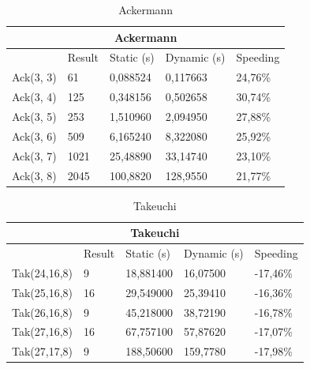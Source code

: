 \documentclass[ack,preface]{dithesis}
\begin{document}
\begin{table}[h!]
\centering
\begin{tabular}{ |p{3cm}||p{2cm}|p{3cm}|p{3cm}||p{2cm}|  }

 \hline
 \multicolumn{5}{|c|}{Ackermann} \\
 \hline
 	& Result &Static (s)&Dynamic (s)&Speeding\\
 \hline
 Ack(3, 3) & 61      &0,088524    &  0,117663    &   24,76\%\\
 Ack(3, 4) & 125    &0,348156    &  0,502658    &  30,74\%\\
 Ack(3, 5) & 253    & 1,510960   &  2,094950    &   27,88\%\\
 Ack(3, 6) & 509    & 6,165240   &  8,322080    &   25,92\%\\
 Ack(3, 7) & 1021  & 25,48890   &  33,14740  &   23,10\%\\
 Ack(3, 8) & 2045  &100,8820    &  128,9550  &  21,77\%\\
 \hline
\end{tabular}
\caption{Ackermann}
\label{table:1}
\end{table}

\begin{table}[h!]
\centering
\begin{tabular}{ |p{3cm}||p{2cm}|p{3cm}|p{3cm}||p{2.5cm}|  }

 \hline
 \multicolumn{5}{|c|}{Takeuchi} \\
 \hline
 	& Result &Static (s)&Dynamic (s)&Speeding\\
 \hline
 Tak(24,16,8) & 9    &  18,881400   &  16,07500     &  -17,46\%\\
 Tak(25,16,8) & 16  &  29,549000   &  25,39410     &  -16,36\%\\
 Tak(26,16,8) & 9    &  45,218000   &  38,72190    &   -16,78\%\\
 Tak(27,16,8) & 16  &  67,757100   &  57,87620    &   -17,07\%\\
 Tak(27,17,8) & 9    &  188,50600  & 159,7780   &  -17,98\%\\
 \hline
\end{tabular}
\caption{Takeuchi}
\label{table:1}
\end{table}
\end{document}
